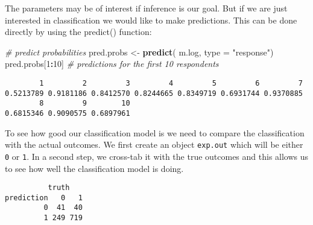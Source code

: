 \documentclass[]{article}
\newenvironment{Shaded}{\begin{snugshade}}{\end{snugshade}}
\newcommand{\CommentTok}[1]{\textcolor[rgb]{0.56,0.35,0.01}{\textit{#1}}}
\newcommand{\DataTypeTok}[1]{\textcolor[rgb]{0.13,0.29,0.53}{#1}}
\newcommand{\DecValTok}[1]{\textcolor[rgb]{0.00,0.00,0.81}{#1}}
\newcommand{\FloatTok}[1]{\textcolor[rgb]{0.00,0.00,0.81}{#1}}
\newcommand{\KeywordTok}[1]{\textcolor[rgb]{0.13,0.29,0.53}{\textbf{#1}}}
\newcommand{\NormalTok}[1]{#1}
\newcommand{\OperatorTok}[1]{\textcolor[rgb]{0.81,0.36,0.00}{\textbf{#1}}}
\newcommand{\StringTok}[1]{\textcolor[rgb]{0.31,0.60,0.02}{#1}}
\begin{document}
The parameters may be of interest if inference is our goal. But if we are just interested in classification we would like to make predictions. This can be done directly by using the predict() function:

\begin{Shaded}
\begin{Highlighting}[]
\CommentTok{# predict probabilities}
\NormalTok{pred.probs <-}\StringTok{ }\KeywordTok{predict}\NormalTok{( m.log, }\DataTypeTok{type =} \StringTok{"response"}\NormalTok{)}
\NormalTok{pred.probs[}\DecValTok{1}\OperatorTok{:}\DecValTok{10}\NormalTok{] }\CommentTok{# predictions for the first 10 respondents}
\end{Highlighting}
\end{Shaded}

\begin{verbatim}
        1         2         3         4         5         6         7 
0.5213789 0.9181186 0.8412570 0.8244665 0.8349719 0.6931744 0.9370885 
        8         9        10 
0.6815346 0.9090575 0.6897961 
\end{verbatim}

To see how good our classification model is we need to compare the classification with the actual outcomes. We first create an object \texttt{exp.out} which will be either \texttt{0} or \texttt{1}. In a second step, we cross-tab it with the true outcomes and this allows us to see how well the classification model is doing.

\begin{Shaded}
\end{Shaded}

\begin{verbatim}
          truth
prediction   0   1
         0  41  40
         1 249 719
\end{verbatim}
\end{document}
